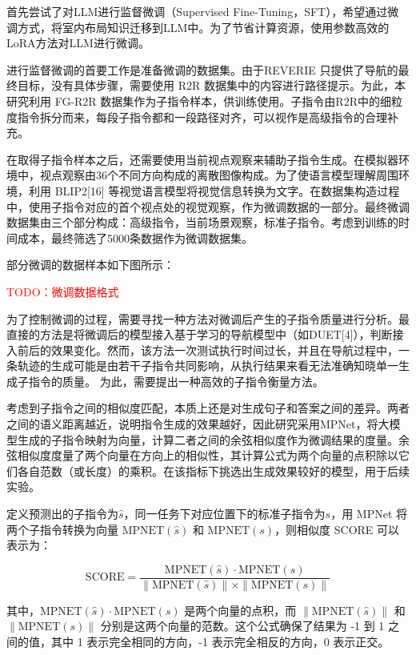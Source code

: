 \documentclass[bachelor]{thesis-uestc}
\begin{document}
首先尝试了对LLM进行监督微调（Supervised Fine-Tuning，SFT），希望通过微调方式，将室内布局知识迁移到LLM中。为了节省计算资源，使用参数高效的LoRA方法对LLM进行微调。

进行监督微调的首要工作是准备微调的数据集。由于REVERIE 只提供了导航的最终目标，没有具体步骤，需要使用 R2R 数据集中的内容进行路径提示。为此，本研究利用 FG-R2R 数据集作为子指令样本，供训练使用。子指令由R2R中的细粒度指令拆分而来，每段子指令都和一段路径对齐，可以视作是高级指令的合理补充。

在取得子指令样本之后，还需要使用当前视点观察来辅助子指令生成。在模拟器环境中，视点观察由36个不同方向构成的离散图像构成。为了使语言模型理解周围环境，利用 BLIP2[16] 等视觉语言模型将视觉信息转换为文字。在数据集构造过程中，使用子指令对应的首个视点处的视觉观察，作为微调数据的一部分。最终微调数据集由三个部分构成：高级指令，当前场景观察，标准子指令。考虑到训练的时间成本，最终筛选了5000条数据作为微调数据集。

部分微调的数据样本如下图所示：

\textcolor{red}{TODO：微调数据格式}

为了控制微调的过程，需要寻找一种方法对微调后产生的子指令质量进行分析。最直接的方法是将微调后的模型接入基于学习的导航模型中（如DUET[4]），判断接入前后的效果变化。然而，该方法一次测试执行时间过长，并且在导航过程中，一条轨迹的生成可能是由若干子指令共同影响，从执行结果来看无法准确知晓单一生成子指令的质量。 为此，需要提出一种高效的子指令衡量方法。

考虑到子指令之间的相似度匹配，本质上还是对生成句子和答案之间的差异。两者之间的语义距离越近，说明指令生成的效果越好，因此研究采用MPNet，将大模型生成的子指令映射为向量，计算二者之间的余弦相似度作为微调结果的度量。余弦相似度度量了两个向量在方向上的相似性，其计算公式为两个向量的点积除以它们各自范数（或长度）的乘积。在该指标下挑选出生成效果较好的模型，用于后续实验。

定义预测出的子指令为$\hat{s}$，同一任务下对应位置下的标准子指令为$s$，用 MPNet 将两个子指令转换为向量 \( \text{MPNET}(\hat{s}) \) 和 \( \text{MPNET}(s) \)，则相似度 SCORE 可以表示为：

\begin{equation}
    \text{SCORE} = \frac{\text{MPNET}(\hat{s}) \cdot \text{MPNET}(s)}{\|\text{MPNET}(\hat{s})\| \times \|\text{MPNET}(s)\|}
\label{mps}
\end{equation}

其中，\( \text{MPNET}(\hat{s}) \cdot \text{MPNET}(s) \) 是两个向量的点积，而 \( \|\text{MPNET}(\hat{s})\| \) 和 \( \|\text{MPNET}(s)\| \) 分别是这两个向量的范数。这个公式确保了结果为 -1 到 1 之间的值，其中 1 表示完全相同的方向，-1 表示完全相反的方向，0 表示正交。
\end{document}
